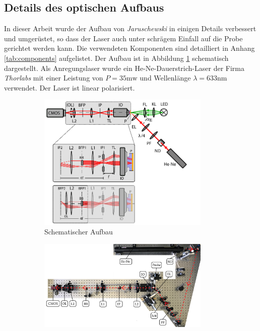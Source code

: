 \documentclass[titlepage]{article}
\begin{document}
	\subsection{Details des optischen Aufbaus}
	In dieser Arbeit wurde der Aufbau von \textit{Jaruschewski} \cite{Jaruschewski.2020} in einigen Details verbessert und umgerüstet, so dass der Laser auch unter schrägem Einfall auf die Probe gerichtet werden kann. Die verwendeten Komponenten sind detailliert in Anhang \ref{tab:components} aufgelistet. Der Aufbau ist in Abbildung \ref{fig:aufbau_schema} schematisch dargestellt. Als Anregungslaser wurde ein He-Ne-Dauerstrich-Laser der Firma \textit{Thorlabs} mit einer Leistung von $P = 35\mathrm{mw}$ und Wellenlänge $\lambda = 633\mathrm{nm}$ verwendet. Der Laser ist linear polarisiert.
	\begin{figure}
		\centering
		\begin{subfigure}[b]{0.9\textwidth}		
			\centering
			\includegraphics[width=0.9\textwidth]{figures/Aufbau_Schema.pdf}
			\caption{Schematischer Aufbau}			
			\label{fig:aufbau_schema}
		\end{subfigure}
		\vfil
		\begin{subfigure}[b]{0.9\textwidth} 
			\centering
			\includegraphics[width=0.9\textwidth]{figures/aufsicht_aufbau_anotated.jpg}

\end{subfigure}
\end{figure}
\end{document}
